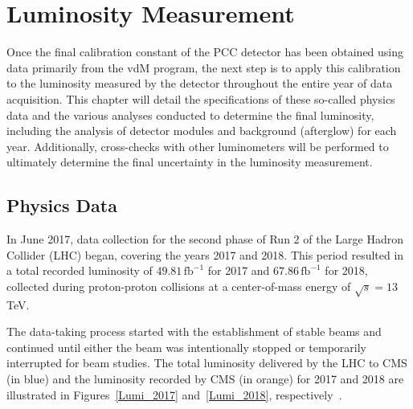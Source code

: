 \chapter{Luminosity Measurement}

Once the final calibration constant of the PCC detector has been obtained using data primarily from the vdM program, the next step is to apply this calibration to the luminosity measured by the detector throughout the entire year of data acquisition. This chapter will detail the specifications of these so-called physics data and the various analyses conducted to determine the final luminosity, including the analysis of detector modules and background (afterglow) for each year. Additionally, cross-checks with other luminometers will be performed to ultimately determine the final uncertainty in the luminosity measurement.


\section{Physics Data}


In June 2017, data collection for the second phase of Run 2 of the Large Hadron Collider (LHC) began, covering the years 2017 and 2018. This period resulted in a total recorded luminosity of \(49.81 \, \text{fb}^{-1}\) for 2017 and \(67.86 \, \text{fb}^{-1}\) for 2018, collected during proton-proton collisions at a center-of-mass energy of \(\sqrt{s} = 13\) TeV.

The data-taking process started with the establishment of stable beams and continued until either the beam was intentionally stopped or temporarily interrupted for beam studies. The total luminosity delivered by the LHC to CMS (in blue) and the luminosity recorded by CMS (in orange) for 2017 and 2018 are illustrated in Figures~\ref{Lumi_2017} and~\ref{Lumi_2018}, respectively~\citep{wikicern}.

